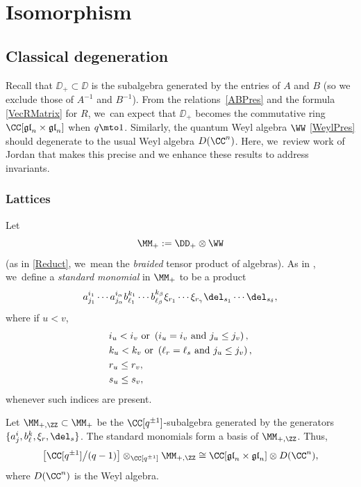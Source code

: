 \section{Isomorphism}

\subsection{Classical degeneration}\label{ClassDegen}
Recall that $\DD_+\subset\DD$ is the subalgebra generated by the entries of $A$ and $B$ (so we exclude those of $A^{-1}$ and $B^{-1}$).
From the relations~\eqref{ABPres} and the formula \eqref{VecRMatrix} for $R$, we~can expect that $\DD_+$ becomes the commutative ring $\CC[\mathfrak{gl}_n\times\mathfrak{gl}_n]$ when $q\mto1$.
Similarly, the quantum Weyl algebra $\WW$ \eqref{WeylPres} should degenerate to the usual Weyl algebra $D(\CC^n)$.
Here, we~review work of Jordan \cite{JordanMult} that makes this precise and we enhance these results to address invariants.

\subsubsection{Lattices}
Let
\[
\MM_+:=\DD_+\otimes\WW
\]
(as in \ref{Reduct}, we~mean the \textit{braided} tensor product of algebras).
As in \cite{JordanMult}, we~define a \textit{standard monomial} in $\MM_+$ to be a product
\begin{equation}
a^{i_1}_{j_1}\cdots a^{i_{\alpha}}_{j_{\alpha}}
b^{k_1}_{\ell_1}\cdots b^{k_{\beta}}_{\ell_{\beta}}
\xi_{r_1}\cdots \xi_{r_\gamma}
\del_{s_1}\cdots\del_{s_\delta},
\label{StandardMon}
\end{equation}
where if $u<v$,
\begin{equation}
\begin{aligned}
&i_u<i_v\hbox{ or }\left(i_u=i_v\hbox{ and }j_u\le j_v\right),\\
&k_u<k_v\hbox{ or }\left(\ell_r=\ell_s\hbox{ and }j_u\le j_v\right),\\
&r_u\le r_v,\\
&s_u\le s_v,
\end{aligned}
\label{StandardIndices}
\end{equation}
whenever such indices are present.

\begin{thm}\label{JorBasis}
Let $\MM_{+,\ZZ}\subset\MM_+$ be the $\CC[q^{\pm 1}]$-subalgebra generated by the generators $\{a^i_j, b^k_\ell, \xi_r, \del_s\}$.
The standard monomials form a basis of $\MM_{+,\ZZ}$.
Thus,
\[
\bigl[ \CC[q^{\pm1}]\big/(q-1) \bigr]\otimes_{\CC[q^{\pm 1}]}\MM_{+,\ZZ}\cong \CC[\mathfrak{gl}_n\times\mathfrak{gl}_n]\otimes D(\CC^n),
\]
where $D(\CC^n)$ is the Weyl algebra.
\end{thm}

